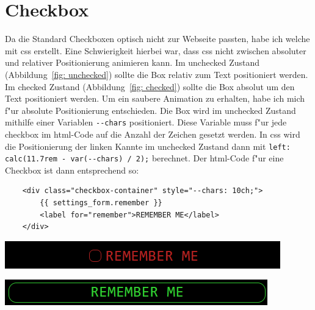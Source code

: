 \section{Checkbox}\label{sec:checkbox}
\lstset{basicstyle=\selectfont\ttfamily, language=CSS}

Da die Standard Checkboxen optisch nicht zur Webseite passten, habe ich welche mit css erstellt.
Eine Schwierigkeit hierbei war, dass css nicht zwischen absoluter und relativer Positionierung animieren kann.
Im unchecked Zustand (Abbildung~\ref{fig: unchecked}) sollte die Box relativ zum Text positioniert werden.
Im checked Zustand (Abbildung~\ref{fig: checked}) sollte die Box absolut um den Text positioniert werden.
Um ein saubere Animation zu erhalten, habe ich mich f{"u}r absolute Positionierung entschieden.
Die Box wird im unchecked Zustand mithilfe einer Variablen \lstinline$--chars$ positioniert.
Diese Variable muss f{"u}r jede checkbox im html-Code auf die Anzahl der Zeichen gesetzt werden.
In css wird die Positionierung der linken Kannte im unchecked Zustand dann mit \lstinline$left: calc(11.7rem - var(--chars) / 2);$ berechnet.
Der html-Code f{"u}r eine Checkbox ist dann entsprechend so:

\vspace{3mm}
\begin{lstlisting}
    <div class="checkbox-container" style="--chars: 10ch;">
        {{ settings_form.remember }}
        <label for="remember">REMEMBER ME</label>
    </div>
\end{lstlisting}
\vspace{3mm}

\begin{minipage}[h]{0.425\textwidth}
    \includegraphics[width=\textwidth]{unchecked}
    \label{fig: unchecked}
\end{minipage}
\hspace{0.05\textwidth}
\begin{minipage}[h]{0.425\textwidth}
    \includegraphics[width=\textwidth]{checked}
    \label{fig: checked}
\end{minipage}


